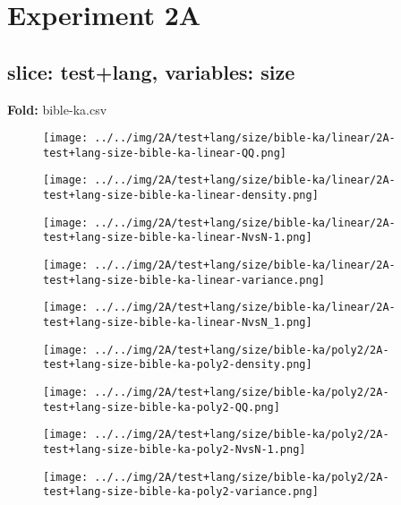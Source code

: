 \section{Experiment 2A}
\subsection{slice: test+lang, variables: size}
\textbf{Fold:} bible-ka.csv
\begin{figure}[H]
\centering	\texttt{[image: ../../img/2A/test+lang/size/bible-ka/linear/2A-test+lang-size-bible-ka-linear-QQ.png]}
\end{figure}
\begin{figure}[H]
\centering	\texttt{[image: ../../img/2A/test+lang/size/bible-ka/linear/2A-test+lang-size-bible-ka-linear-density.png]}
\end{figure}
\begin{figure}[H]
\centering	\texttt{[image: ../../img/2A/test+lang/size/bible-ka/linear/2A-test+lang-size-bible-ka-linear-NvsN-1.png]}
\end{figure}
\begin{figure}[H]
\centering	\texttt{[image: ../../img/2A/test+lang/size/bible-ka/linear/2A-test+lang-size-bible-ka-linear-variance.png]}
\end{figure}
\begin{figure}[H]
\centering	\texttt{[image: ../../img/2A/test+lang/size/bible-ka/linear/2A-test+lang-size-bible-ka-linear-NvsN\_1.png]}
\end{figure}
\begin{figure}[H]
\centering	\texttt{[image: ../../img/2A/test+lang/size/bible-ka/poly2/2A-test+lang-size-bible-ka-poly2-density.png]}
\end{figure}
\begin{figure}[H]
\centering	\texttt{[image: ../../img/2A/test+lang/size/bible-ka/poly2/2A-test+lang-size-bible-ka-poly2-QQ.png]}
\end{figure}
\begin{figure}[H]
\centering	\texttt{[image: ../../img/2A/test+lang/size/bible-ka/poly2/2A-test+lang-size-bible-ka-poly2-NvsN-1.png]}
\end{figure}
\begin{figure}[H]
\centering	\texttt{[image: ../../img/2A/test+lang/size/bible-ka/poly2/2A-test+lang-size-bible-ka-poly2-variance.png]}
\end{figure}
